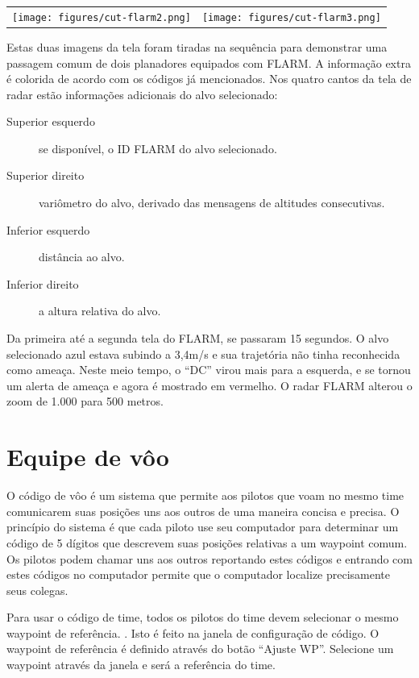 \begin{center}
\begin{tabular}{c c}
\texttt{[image: figures/cut-flarm2.png]}&
\texttt{[image: figures/cut-flarm3.png]}\\
\end{tabular}
\end{center}
Estas duas imagens da tela foram tiradas na sequência para demonstrar uma passagem comum de dois planadores equipados com FLARM.  A informação extra é colorida de acordo com os códigos já mencionados.  Nos quatro cantos da tela de radar estão informações adicionais do alvo selecionado:

\begin{description}
\item[Superior esquerdo]  se disponível, o ID FLARM do alvo selecionado.
\item[Superior direito]  variômetro do alvo, derivado das mensagens de altitudes consecutivas.
\item[Inferior esquerdo]  distância ao alvo.
\item[Inferior direito]  a altura relativa do alvo.
\end{description}

Da primeira até a segunda tela do FLARM, se passaram 15 segundos.  O alvo selecionado azul estava subindo a 3,4m/s e sua trajetória não tinha reconhecida como ameaça.  Neste meio tempo, o “DC” virou mais para a esquerda, e se tornou um alerta de ameaça e agora é mostrado em vermelho.  O radar FLARM alterou o zoom de 1.000 para 500 metros.  

\section{Equipe de vôo}\label{sec:team-flying}

O código de vôo é um sistema que permite aos pilotos que voam no mesmo time comunicarem suas posições uns aos outros de uma maneira concisa e precisa.  O princípio do sistema é que cada piloto use seu computador para determinar um código de 5 dígitos que descrevem suas posições relativas a um waypoint comum.  Os pilotos podem chamar uns aos outros reportando estes códigos e entrando com estes códigos no computador permite que o computador localize precisamente seus colegas.

Para usar o código de time, todos os pilotos do time devem selecionar o mesmo waypoint de referência. .  Isto é feito na janela de configuração de código. 
O waypoint de referência é definido através do botão “Ajuste WP”.  Selecione um waypoint através da janela e será a referência do time.

